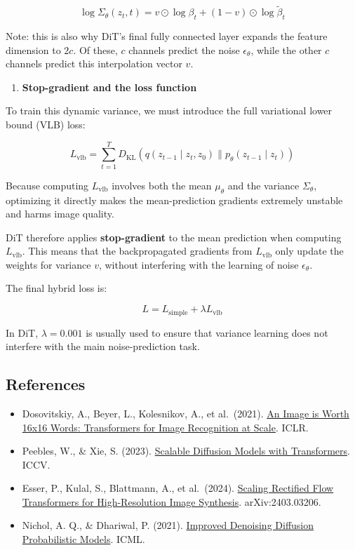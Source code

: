 \[
\log\Sigma_\theta(z_t,t)=v\odot\log\beta_t+(1-v)\odot\log\tilde{\beta}_t
\]

Note: this is also why DiT's final fully connected layer expands the feature dimension to \(2c\). Of these, \(c\) channels predict the noise \(\epsilon_\theta\), while the other \(c\) channels predict this interpolation vector \(v\).

\begin{enumerate}
\def\labelenumi{\arabic{enumi}.}
\setcounter{enumi}{1}
\tightlist
\item
  \textbf{Stop-gradient and the loss function}
\end{enumerate}

To train this dynamic variance, we must introduce the full variational lower bound (VLB) loss:

\[
L_{\mathrm{vlb}}=\sum_{t=1}^{T}D_{\mathrm{KL}}\left(q(z_{t-1}\mid z_t,z_0)\parallel p_\theta(z_{t-1}\mid z_t)\right)
\]

Because computing \(L_{\mathrm{vlb}}\) involves both the mean \(\mu_\theta\) and the variance \(\Sigma_\theta\), optimizing it directly makes the mean-prediction gradients extremely unstable and harms image quality.

DiT therefore applies \textbf{stop-gradient} to the mean prediction when computing \(L_{\mathrm{vlb}}\). This means that the backpropagated gradients from \(L_{\mathrm{vlb}}\) only update the weights for variance \(v\), without interfering with the learning of noise \(\epsilon_\theta\).

The final hybrid loss is:

\[
L=L_{\mathrm{simple}}+\lambda L_{\mathrm{vlb}}
\]

In DiT, \(\lambda=0.001\) is usually used to ensure that variance learning does not interfere with the main noise-prediction task.

\FloatBarrier
{}
\hypertarget{references-131}{%
\subsection{References}\label{references-131}}

\vspace{0.25em}
\begin{itemize}
\tightlist
\item
  Dosovitskiy, A., Beyer, L., Kolesnikov, A., et al.~(2021). \href{https://arxiv.org/abs/2010.11929}{An Image is Worth 16x16 Words: Transformers for Image Recognition at Scale}. ICLR.
\item
  Peebles, W., \& Xie, S. (2023). \href{https://arxiv.org/abs/2212.09748}{Scalable Diffusion Models with Transformers}. ICCV.
\item
  Esser, P., Kulal, S., Blattmann, A., et al.~(2024). \href{https://arxiv.org/abs/2403.03206}{Scaling Rectified Flow Transformers for High-Resolution Image Synthesis}. arXiv:2403.03206.
\item
  Nichol, A. Q., \& Dhariwal, P. (2021). \href{https://arxiv.org/abs/2102.09672}{Improved Denoising Diffusion Probabilistic Models}. ICML.
\end{itemize}

\clearpage
